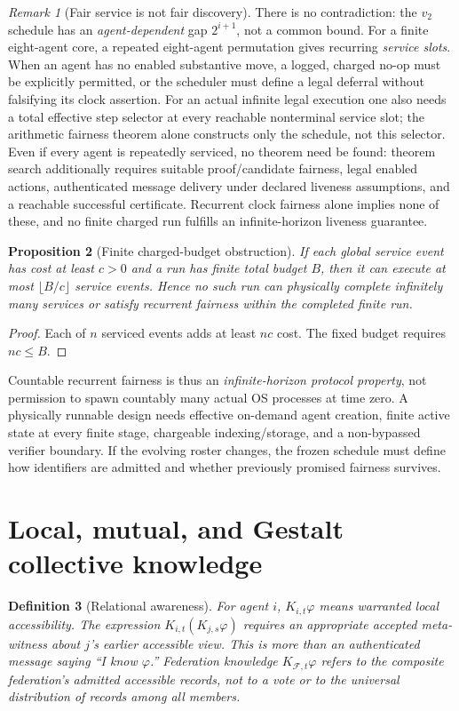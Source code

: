 \documentclass[10pt,letterpaper]{article}
\newtheorem{definition}{Definition}[section]
\newtheorem{proposition}[definition]{Proposition}
\theoremstyle{remark}\newtheorem{remark}[definition]{Remark}
\newcommand{\F}{\mathcal{F}}
\begin{document}
\begin{remark}[Fair service is not fair discovery]
There is no contradiction: the $v_2$ schedule has an \emph{agent-dependent} gap $2^{i+1}$, not a common bound. For a finite eight-agent core, a repeated eight-agent permutation gives recurring \emph{service slots}. When an agent has no enabled substantive move, a logged, charged no-op must be explicitly permitted, or the scheduler must define a legal deferral without falsifying its clock assertion. For an actual infinite legal execution one also needs a total effective step selector at every reachable nonterminal service slot; the arithmetic fairness theorem alone constructs only the schedule, not this selector. Even if every agent is repeatedly serviced, no theorem need be found: theorem search additionally requires suitable proof/candidate fairness, legal enabled actions, authenticated message delivery under declared liveness assumptions, and a reachable successful certificate. Recurrent clock fairness alone implies none of these, and no finite charged run fulfills an infinite-horizon liveness guarantee.
\end{remark}

\begin{proposition}[Finite charged-budget obstruction]
If each global service event has cost at least $c>0$ and a run has finite total budget $B$, then it can execute at most $\lfloor B/c\rfloor$ service events. Hence no such run can physically complete infinitely many services or satisfy recurrent fairness \emph{within the completed finite run}.
\end{proposition}
\begin{proof}
Each of $n$ serviced events adds at least $nc$ cost. The fixed budget requires $nc\le B$.
\end{proof}

Countable recurrent fairness is thus an \emph{infinite-horizon protocol property}, not permission to spawn countably many actual OS processes at time zero. A physically runnable design needs effective on-demand agent creation, finite active state at every finite stage, chargeable indexing/storage, and a non-bypassed verifier boundary. If the evolving roster changes, the frozen schedule must define how identifiers are admitted and whether previously promised fairness survives.

\section{Local, mutual, and Gestalt collective knowledge}
\begin{definition}[Relational awareness]
For agent $i$, $K_{i,t}\varphi$ means warranted local accessibility. The expression $K_{i,t}(K_{j,s}\varphi)$ requires an appropriate accepted \emph{meta}-witness about $j$'s earlier accessible view. This is more than an authenticated message saying ``I know $\varphi$.'' Federation knowledge $K_{\F,t}\varphi$ refers to the composite federation's admitted accessible records, not to a vote or to the universal distribution of records among all members.
\end{definition}
\end{document}
